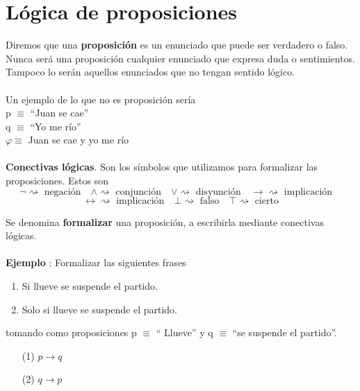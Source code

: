 
\section{Lógica de proposiciones}
\begin{definition} Diremos que una \textbf{proposición} es un enunciado que puede ser verdadero o falso. Nunca será una proposición cualquier enunciado que expresa duda o sentimientos. Tampoco lo serán aquellos enunciados que no tengan sentido lógico. 
\end{definition}
\paragraph{}
Un ejemplo de lo que no es proposición sería
\\
p $\equiv$ ``Juan se cae'' 
\\
q $\equiv$ ``Yo me río''
\\
$\varphi \equiv$ Juan se cae y yo me río  
\paragraph{}
\textbf{Conectivas lógicas}. Son los símbolos que utilizamos para formalizar las proposiciones. Estos son 
\[ \lnot \rightsquigarrow \mbox{ negación} \quad \wedge \rightsquigarrow \mbox{ conjunción} \quad 
\lor \rightsquigarrow \mbox{ disyunción} \quad \rightarrow \rightsquigarrow \mbox{ implicación} \quad
 \]  
 \[\leftrightarrow \rightsquigarrow \mbox{ implicación} \quad \bot \rightsquigarrow \mbox{ falso} \quad 
\top \rightsquigarrow \mbox{ cierto} \]

\begin{definition} Se denomina \textbf{formalizar} una proposición, a escribirla mediante conectivas lógicas. 
\end{definition}
\paragraph{}
\addtocounter{ej}{1} %
\textbf{Ejemplo }: Formalizar las siguientes frases 
\begin{enumerate}
	\item Si llueve se suspende el partido. 
	\item Solo si llueve se suspende el partido.
\end{enumerate}
tomando como proposiciones p $\equiv$ `` Llueve'' y q $\equiv$ ``se suspende el partido''.
\begin{itemize}
	\item[(1)] $ p\rightarrow q$
	\item[(2)] $ q\rightarrow p$
\end{itemize} 

